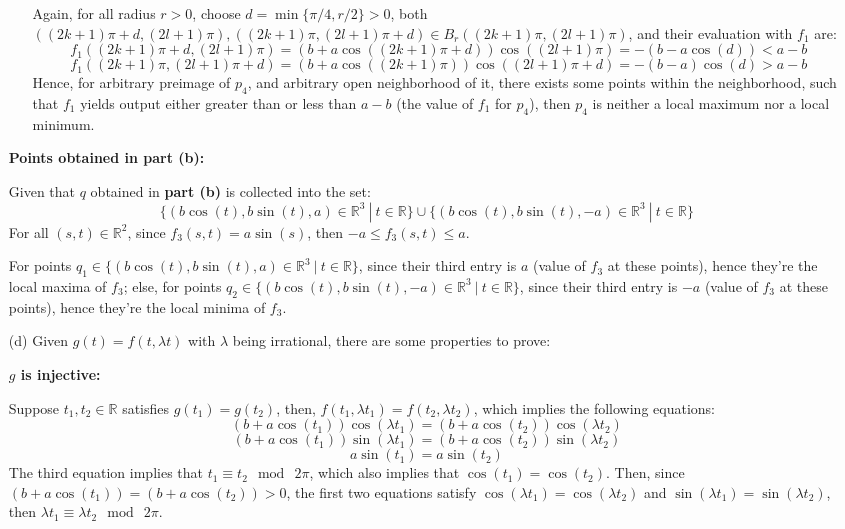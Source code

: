 \documentclass{article}
\begin{document}
\begin{itemize}
\begin{itemize}
        Again, for all radius $r>0$, choose $d=\min\{\pi/4,r/2\}>0$, both $((2k+1)\pi+d, (2l+1)\pi),((2k+1)\pi, (2l+1)\pi+d)\in B_r((2k+1)\pi, (2l+1)\pi)$, and their evaluation with $f_1$ are:
        $$f_1((2k+1)\pi+d, (2l+1)\pi)=(b+a\cos((2k+1)\pi+d))\cos((2l+1)\pi) = -(b-a\cos(d))<a-b$$
        $$f_1((2k+1)\pi, (2l+1)\pi+d)=(b+a\cos((2k+1)\pi))\cos((2l+1)\pi+d) = -(b-a)\cos(d)>a-b$$
        Hence, for arbitrary preimage of $p_4$, and arbitrary open neighborhood of it, there exists some points within the neighborhood, such that $f_1$ yields output either greater than or less than $a-b$ (the value of $f_1$ for $p_4$),
        then $p_4$ is neither a local maximum nor a local minimum.
    \end{itemize}

    \hfil

    \textbf{Points obtained in part (b):}

    Given that $q$ obtained in \textbf{part (b)} is collected into the set:
    $$\{(b\cos(t),b\sin(t),a)\in\mathbb{R}^3\ |\ t\in\mathbb{R}\}\cup \{(b\cos(t),b\sin(t),-a)\in\mathbb{R}^3\ |\ t\in\mathbb{R}\}$$
    For all $(s,t)\in\mathbb{R}^2$, since $f_3(s,t)=a\sin(s)$, then $-a\leq f_3(s,t)\leq a$.

    For points $q_1\in\{(b\cos(t),b\sin(t),a)\in\mathbb{R}^3\ |\ t\in\mathbb{R}\}$, since their third entry is $a$ (value of $f_3$ at these points), hence they're the local maxima of $f_3$;
    else, for points $q_2\in \{(b\cos(t),b\sin(t),-a)\in\mathbb{R}^3\ |\ t\in\mathbb{R}\}$, since their third entry is $-a$ (value of $f_3$ at these points), hence they're the local minima of $f_3$.

    \hfil

    \item[(d)] Given $g(t)=f(t,\lambda t)$ with $\lambda$ being irrational, there are some properties to prove:
    
    \hfil

    \textbf{$g$ is injective:}

    Suppose $t_1,t_2\in\mathbb{R}$ satisfies $g(t_1)=g(t_2)$, then, $f(t_1,\lambda t_1)=f(t_2,\lambda t_2)$, which implies the following equations:
    $$(b+a\cos(t_1))\cos(\lambda t_1)=(b+a\cos(t_2))\cos(\lambda t_2)$$
    $$(b+a\cos(t_1))\sin(\lambda t_1)=(b+a\cos(t_2))\sin(\lambda t_2)$$
    $$a\sin(t_1)=a\sin(t_2)$$
    The third equation implies that $t_1\equiv t_2\mod\ 2\pi$, which also implies that $\cos(t_1)=\cos(t_2)$. Then, since $(b+a\cos(t_1))=(b+a\cos(t_2))>0$, the first two equations satisfy $\cos(\lambda t_1)=\cos(\lambda t_2)$ and $\sin(\lambda t_1)=\sin(\lambda t_2)$,
    then $\lambda t_1 \equiv \lambda t_2\mod\ 2\pi$.


\end{itemize}
\end{document}
